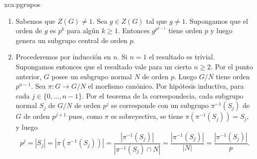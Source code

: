 \begin{sol}{xca:pgrupos}
	\begin{enumerate}
		\item Sabemos que $Z(G)\ne1$. Sea $g\in Z(G)$ tal que $g\ne 1$.
			Supongamos que el orden de $g$ es $p^k$ para algún $k\geq1$.
			Entonces $g^{p^{k-1}}$ tiene orden $p$ y luego genera un subgrupo
			central de orden $p$. 
		\item Procederemos por inducción en $n$. Si $n=1$ el resultado es
			trivial.  Supongamos entonces que el resultado vale para un cierto
			$n\geq2$. Por el punto anterior, $G$ posee un subgrupo normal $N$
			de orden $p$. Luego $G/N$ tiene orden $p^{n-1}$. Sea $\pi\colon G\to G/N$ el morfismo canónico. 
			Por hipótesis
			inductiva, para cada $j\in\{0,\dots,n-1\}$. Por el teorema de la
			correspondecia, cada subgrupo normal $S_j$ de $G/N$ de orden $p^j$ se
			corresponde con un subgrupo $\pi^{-1}(S_j)$ de $G$ de orden $p^{j+1}$ pues, como
			$\pi$ es sobreyectiva, se tiene $\pi(\pi^{-1}(S_j))=S_j$, y luego
			\[
			p^j=|S_j|=|\pi(\pi^{-1}(S_j))|=\frac{|\pi^{-1}(S_j)|}{|\pi^{-1}(S_j)\cap N|}=\frac{|\pi^{-1}(S_j)|}{|N|}=\frac{|\pi^{-1}(S_j)|}{p}.
			\]
	\end{enumerate}
\end{sol}

